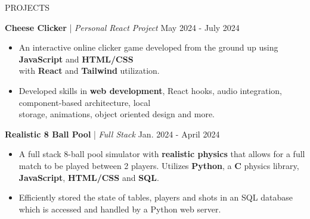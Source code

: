 \begin{rSection}{PROJECTS}

\quad\textbf{Cheese Clicker} | \textit{Personal React Project } \hfill May 2024 - July 2024\\
\renewcommand\labelitemi{$\vcenter{\hbox{\tiny$\bullet$}}$}
\begin{itemize}
    \itemsep -4pt {} \vspace{-1.5em}
        \item An interactive online clicker game developed from the ground up using \textbf{JavaScript} and \textbf{HTML/CSS} \\ with \textbf{React} and \textbf{Tailwind} utilization.
        \item Developed skills in \textbf{web development}, React hooks, audio integration, component-based architecture, local \\ storage, animations, object oriented design and more.
\end{itemize}

\quad\textbf{Realistic 8 Ball Pool} | \textit{Full Stack} \hfill Jan. 2024 - April 2024\\
\renewcommand\labelitemi{$\vcenter{\hbox{\tiny$\bullet$}}$}
\begin{itemize}
    \itemsep -4pt {} \vspace{-1.5em} 
        \item A full stack 8-ball pool simulator with \textbf{realistic physics} that allows for a full match to be played between 2 players. Utilizes \textbf{Python}, a \textbf{C} physics library, \textbf{JavaScript}, \textbf{HTML/CSS} and \textbf{SQL}.
        \item Efficiently stored the state of tables, players and shots in an SQL database which is accessed and handled by a Python web server.
\end{itemize}


\end{rSection} 
